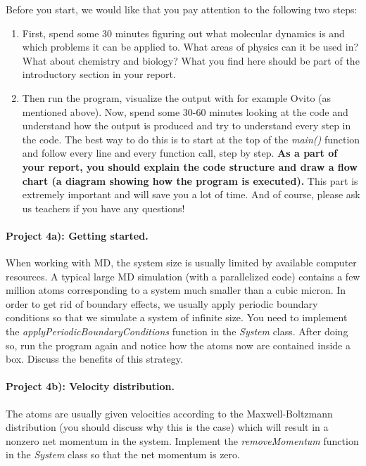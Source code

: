 \documentclass[%
oneside,                 %
final,                   %
10pt]{article}
\begin{document}
Before you start, we would like that you pay attention to the following two steps:
\begin{enumerate}
 \item First, spend some 30 minutes figuring out what molecular dynamics is and which problems it can be applied to. What areas of physics can it be used in? What about chemistry and biology? What you find here should be part of the  introductory section in your report.

 \item Then run the program, visualize the output with for example Ovito (as mentioned above). Now, spend some 30-60 minutes looking at the code and understand how the output is produced and try to understand every step in the code. The best way to do this is to start at the top of the \emph{main()} function and follow every line and every function call, step by step. \textbf{As a part of your report, you should explain the code structure and draw a flow chart (a diagram showing how the program is executed).} This part is extremely important and will save you a lot of time. And of course, please ask us teachers if you have any questions!
\end{enumerate}

\noindent
\paragraph{Project 4a): Getting started.}
When working with MD, the system size is usually limited by available computer resources. A typical large MD simulation (with a parallelized code) contains a few million atoms corresponding to a system much smaller than a cubic micron. In order to get rid of boundary effects, we usually apply periodic boundary conditions so that we simulate a system of infinite size. You need to implement the \emph{applyPeriodicBoundaryConditions} function in the \emph{System} class. After doing so, run the program again and notice how the atoms now are contained inside a box. Discuss the benefits of this strategy.

\paragraph{Project 4b): Velocity distribution.}
The atoms are usually given velocities according to the Maxwell-Boltzmann distribution (you should discuss why this is the case) which will result in a nonzero net momentum in the system. Implement the \emph{removeMomentum} function in the \emph{System} class so that the net momentum is zero.
\end{document}

